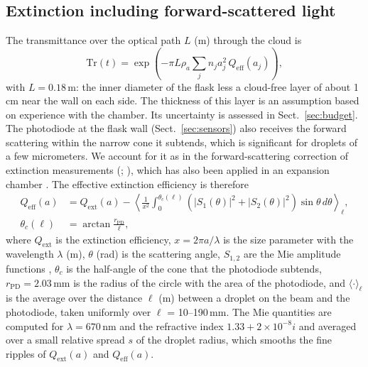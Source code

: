 \documentclass[preprint,review,12pt,authoryear]{elsarticle}
\begin{document}
\subsection{Extinction including forward-scattered light}
\label{sec:forward}
The transmittance over the optical path $L$ (m) through the cloud is
\begin{equation}
\mathrm{Tr}(t) = \exp\!\left(-\pi L \rho_a \sum_j n_j a_j^2\, Q_\mathrm{eff}(a_j)\right),
\label{eq:tr}
\end{equation}
with $L = 0.18$\,m: the inner diameter of the flask less a cloud-free layer of about 1\,cm near the
wall on each side. The thickness of this
layer is an assumption based on experience with the chamber. Its uncertainty is assessed in
Sect.~\ref{sec:budget}.
The photodiode at the flask wall (Sect.~\ref{sec:sensors}) also receives the forward scattering
within the narrow cone it subtends, which is significant for droplets of a few micrometers.
We account for it as in the forward-scattering correction of extinction measurements
(\citealp{deepak1978forwardscattering1,deepak1978forwardscattering2};
\citealp[Sect.~4.4.3]{bohren1983absorption}),
which has also been applied in an expansion chamber \citep{szymanski1990absolute}.
The effective extinction efficiency is therefore
\begin{equation}
\begin{aligned}
Q_\mathrm{eff}(a) &= Q_\mathrm{ext}(a) - \left\langle \frac{1}{x^2}\int_0^{\theta_c(\ell)}
\left(|S_1(\theta)|^2 + |S_2(\theta)|^2\right)\sin\theta\,d\theta \right\rangle_\ell,\\
\theta_c(\ell) &= \arctan\frac{r_\mathrm{PD}}{\ell},
\end{aligned}
\label{eq:qeff}
\end{equation}
where $Q_\mathrm{ext}$ is the extinction efficiency, $x = 2\pi a/\lambda$ is the size parameter
with the wavelength $\lambda$ (m), $\theta$ (rad) is the scattering angle, $S_{1,2}$
are the Mie amplitude functions
\citep[Eq.~4.74]{bohren1983absorption}, $\theta_c$ is the half-angle of the cone that the photodiode subtends,
$r_\mathrm{PD} = 2.03$\,mm is the radius of the circle with the area of the photodiode, and
$\langle\cdot\rangle_\ell$ is the average over the distance $\ell$ (m)
between a droplet on the beam and the photodiode, taken uniformly over $\ell$ = 10--190\,mm.
The Mie quantities are computed for $\lambda = 670$\,nm and the refractive index
$1.33 + 2\times10^{-8}i$ and averaged over a small relative spread $s$ of the
droplet radius,
which smooths the fine ripples of $Q_\mathrm{ext}(a)$ and $Q_\mathrm{eff}(a)$.
\end{document}
